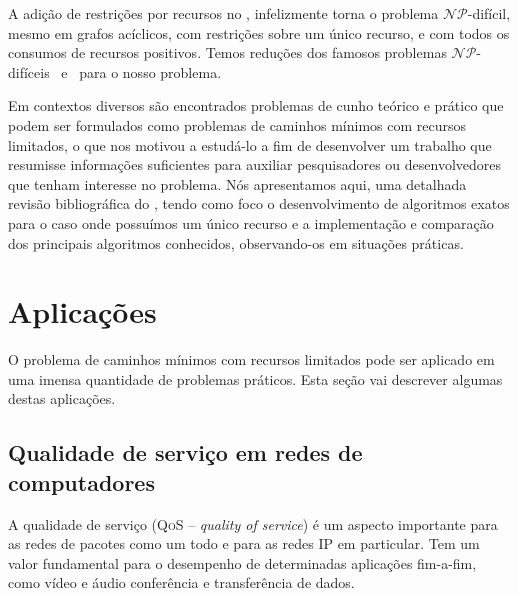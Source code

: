 A adição de restrições por recursos no \spp, infelizmente torna o 
problema $\mathcal{NP}$-difícil, mesmo em grafos acíclicos, com 
restrições sobre um único recurso, e com todos os consumos de recursos 
positivos. Temos reduções dos famosos problemas $\mathcal{NP}$-difíceis 
\mochila~e \particao~para o nosso problema. 

Em contextos diversos são encontrados problemas de cunho teórico e 
prático que podem ser formulados como problemas de caminhos mínimos com 
recursos limitados, o que nos motivou a estudá-lo a fim de desenvolver 
um trabalho que resumisse informações suficientes para auxiliar 
pesquisadores ou desenvolvedores que tenham interesse no problema.
Nós apresentamos aqui, uma detalhada revisão bibliográfica do \rcsp, 
tendo como foco o desenvolvimento de algoritmos exatos para o caso onde 
possuímos um único recurso e a implementação e comparação dos principais 
algoritmos conhecidos, observando-os em situações práticas.

\section{Aplicações}

O problema de caminhos mínimos com recursos limitados pode ser aplicado 
em uma imensa quantidade de problemas práticos. Esta seção vai descrever 
algumas destas aplicações.




\subsection{Qualidade de serviço em redes de computadores}

A qualidade de serviço (\textsc{QoS} -- \emph{quality of service})
é um aspecto importante para as redes de pacotes como um todo e para as 
redes \textsc{IP} em particular. Tem um valor fundamental para o 
desempenho de determinadas aplicações fim-a-fim, como vídeo e áudio 
conferência e transferência de dados.

